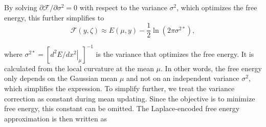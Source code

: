 By solving $\partial\mathcal{F}/\partial\sigma^2=0$ with respect
to the variance $\sigma^2$, which optimizes the free energy,
this further simplifies to
\begin{equation}
    \mathcal{F}(y,\zeta)
    \approx E(\mu,y)-\frac{1}{2}\ln(2\pi\sigma^{2*}),
\end{equation}

where $\sigma^{2*}=\left[\left.d^2E/dx^2\right|_{\mu}\right]^{-1}$
is the variance that optimizes the free energy. It is calculated
from the local curvature at the mean $\mu$. In other words, the
free energy only depends on the Gaussian mean $\mu$ and not on
an independent variance $\sigma^2$, which simplifies the expression.
To simplify further, we treat the variance correction as constant
during mean updating. Since the objective is to minimize free
energy, this constant can be omitted. The Laplace-encoded free
energy approximation is then written as

